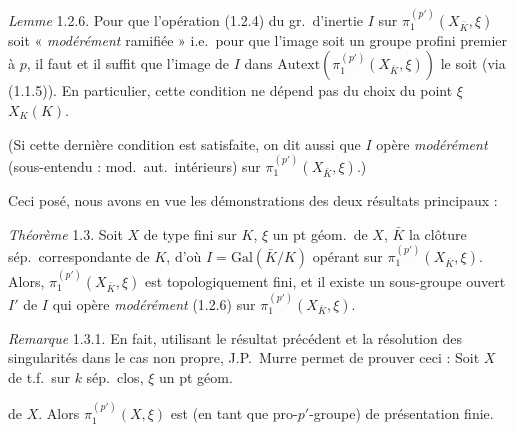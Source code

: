 \documentclass[11pt,a4paper]{article}
\begin{document}
\emph{Lemme} 1.2.6. Pour que l'opération (1.2.4) du gr.\ d'inertie $I$ sur $\pi_1^{(p')}(X_{\bar K}, \xi)$ soit « \emph{modérément} ramifiée » i.e.\ pour que l'image  soit un groupe profini premier à $p$, il faut et il suffit que l'image de $I$ dans $\mathrm{Autext}(\pi_1^{(p')}(X_{\bar K}, \xi))$ le soit (via (1.1.5)). En particulier, cette condition ne dépend pas du choix du point \struck{\ill{}} $\xi$  $X_K(K)$.

  (Si cette dernière condition est satisfaite, on dit aussi que $I$ opère \emph{modérément} (sous-entendu : mod.\ aut.\ intérieurs) sur $\pi_1^{(p')}(X_{\bar K}, \xi)$.)

Ceci posé, nous avons en vue les démonstrations des deux résultats principaux  :

\emph{Théorème} 1.3. Soit $X$ de type fini sur  $K$, $\xi$ un pt géom.\ de $X$, $\bar K$ la clôture sép.\ correspondante de $K$, d'où $I = \mathrm{Gal}(\bar K/K)$ opérant  sur $\pi_1^{(p')}(X_{\bar K}, \xi)$. Alors,  $\pi_1^{(p')}(X_{\bar K}, \xi)$ est topologiquement  \struck{\ill{}} fini, et il existe un sous-groupe ouvert $I'$ de $I$ qui opère \emph{modérément} (1.2.6) sur $\pi_1^{(p')}(X_{\bar K}, \xi)$.\marginal{\struck{\ill{}}}

\emph{Remarque} 1.3.1. En fait, utilisant le résultat précédent   et la résolution des singularités dans le cas non propre,  J.P.~Murre permet de prouver ceci : Soit $X$ de t.f.\ sur $k$ sép.\ clos, \struck{\ill{}}  $\xi$ un pt géom.

de $X$. Alors $\pi_1^{(p')}(X, \xi)$ est (en tant que pro-$p'$-groupe) de présentation finie.
\end{document}
